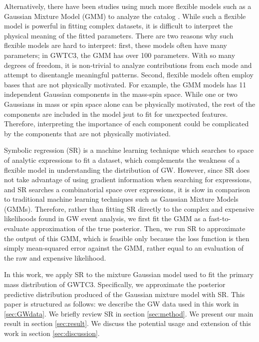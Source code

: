 \documentclass[nohyperref]{article}
\theoremstyle{plain}
\theoremstyle{definition}
\theoremstyle{remark}
\begin{document}
Alternatively, there have been studies using much more flexible models such as a Gaussian Mixture Model (GMM) to analyze the catalog \cite{Tiwari:2020vym}.
While such a flexible model is powerful in fitting complex datasets,
it is difficult to interpret the physical meaning of the fitted parameters.
There are two reasons why such flexible models are hard to interpret:
first, these models often have many parameters;
in GWTC3, the GMM has over 100 parameters.
With so many degrees of freedom, it is non-trivial to analyze contributions from each mode and attempt to disentangle meaningful patterns.
Second, flexible models often employ bases that are not physically motivated.
For example, the GMM models has 11 independent Gaussian components in the mass-spin space.
While one or two Gaussians in mass or spin space alone can be physically motivated,
the rest of the components are included in the model jsut to fit for unexpected features.
Therefore, interpreting the importance of each component could be complicated by the components that are not physically motiviated.

Symbolic regression (SR) is a machine learning technique which searches to space of analytic expressions to fit a dataset, which complements the weakness of a flexible model in understanding the distribution of GW.
However, since SR does not take advantage of using gradient information when searching for expressions,
and  SR searches a combinatorial space over expressions,
it is slow in comparison to traditional machine learning techniques such as Gaussian Mixture Models (GMMs).
Therefore, rather than fitting SR directly to the complex and expensive likelihoods found in GW event analysis, we first fit the GMM as a fast-to-evaluate approximation of the true posterior.
Then, we run SR to approximate the output of this GMM, which is feasible only because the loss function is then simply mean-squared error against the GMM, rather equal to an evaluation of the raw and expensive likelihood.

In this work, we apply SR to the mixture Gaussian model used to fit the primary mass distribution of GWTC3.
Specifically, we approximate the posterior predictive distribution produced of the Gaussian mixture model with SR.
This paper is structured as follows: we describe the GW data used in this work in \ref{sec:GWdata}.
We briefly review SR in section \ref{sec:method}.
We present our main result in section \ref{sec:result}.
We discuss the potential usage and extension of this work in section \ref{sec:discussion}.
\end{document}
